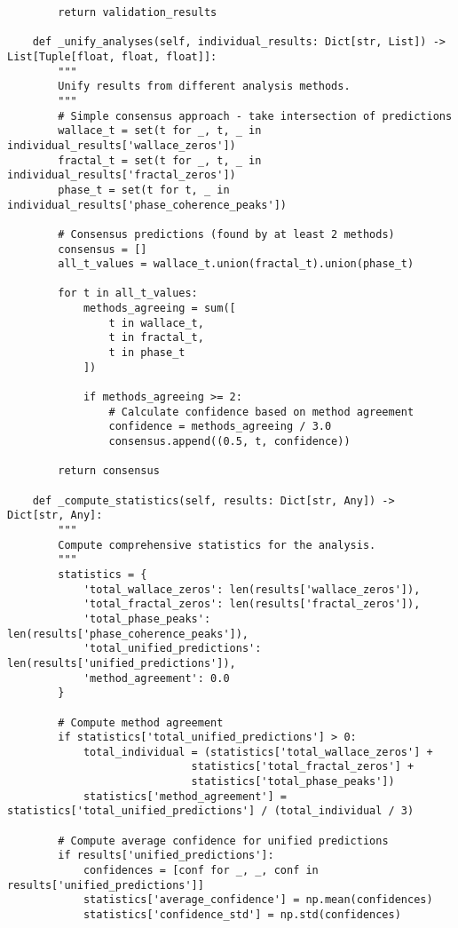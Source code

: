 \documentclass[12pt]{article}
\begin{document}
\begin{lstlisting}
        return validation_results

    def _unify_analyses(self, individual_results: Dict[str, List]) -> List[Tuple[float, float, float]]:
        """
        Unify results from different analysis methods.
        """
        # Simple consensus approach - take intersection of predictions
        wallace_t = set(t for _, t, _ in individual_results['wallace_zeros'])
        fractal_t = set(t for _, t, _ in individual_results['fractal_zeros'])
        phase_t = set(t for t, _ in individual_results['phase_coherence_peaks'])

        # Consensus predictions (found by at least 2 methods)
        consensus = []
        all_t_values = wallace_t.union(fractal_t).union(phase_t)

        for t in all_t_values:
            methods_agreeing = sum([
                t in wallace_t,
                t in fractal_t,
                t in phase_t
            ])

            if methods_agreeing >= 2:
                # Calculate confidence based on method agreement
                confidence = methods_agreeing / 3.0
                consensus.append((0.5, t, confidence))

        return consensus

    def _compute_statistics(self, results: Dict[str, Any]) -> Dict[str, Any]:
        """
        Compute comprehensive statistics for the analysis.
        """
        statistics = {
            'total_wallace_zeros': len(results['wallace_zeros']),
            'total_fractal_zeros': len(results['fractal_zeros']),
            'total_phase_peaks': len(results['phase_coherence_peaks']),
            'total_unified_predictions': len(results['unified_predictions']),
            'method_agreement': 0.0
        }

        # Compute method agreement
        if statistics['total_unified_predictions'] > 0:
            total_individual = (statistics['total_wallace_zeros'] +
                             statistics['total_fractal_zeros'] +
                             statistics['total_phase_peaks'])
            statistics['method_agreement'] = statistics['total_unified_predictions'] / (total_individual / 3)

        # Compute average confidence for unified predictions
        if results['unified_predictions']:
            confidences = [conf for _, _, conf in results['unified_predictions']]
            statistics['average_confidence'] = np.mean(confidences)
            statistics['confidence_std'] = np.std(confidences)


\end{lstlisting}
\end{document}
